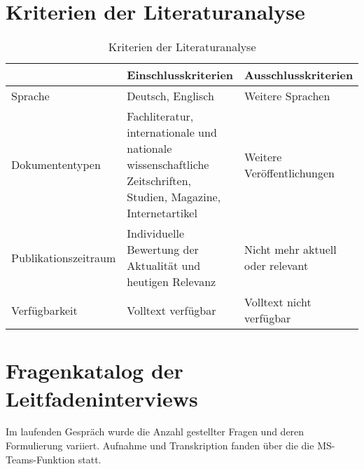 \newpage
\section{Kriterien der Literaturanalyse}
\begin{table}[ht]
    \begin{center}
    \begin{tabular}{|p{}|p{}|p{}|}
        \hline  & Einschlusskriterien & Ausschlusskriterien \\[0.5ex]
        \hline Sprache & Deutsch, Englisch & Weitere Sprachen\\
        \hline Dokumententypen & Fachliteratur, internationale und nationale wissenschaftliche Zeitschriften, Studien, Magazine, Internetartikel & Weitere Veröffentlichungen\\
        \hline Publikationszeitraum & Individuelle Bewertung der Aktualität und heutigen Relevanz & Nicht mehr aktuell oder relevant\\
        \hline Verfügbarkeit & Volltext verfügbar & Volltext nicht verfügbar\\
        \hline
    \end{tabular}
    \end{center}
    \caption{Kriterien der Literaturanalyse}
    \label{tab:kriterien}
\end{table}   
\newpage

\section{Fragenkatalog der Leitfadeninterviews}
Im laufenden Gespräch wurde die Anzahl gestellter Fragen und deren Formulierung variiert. Aufnahme und Transkription fanden über die die MS-Teams-Funktion statt.

